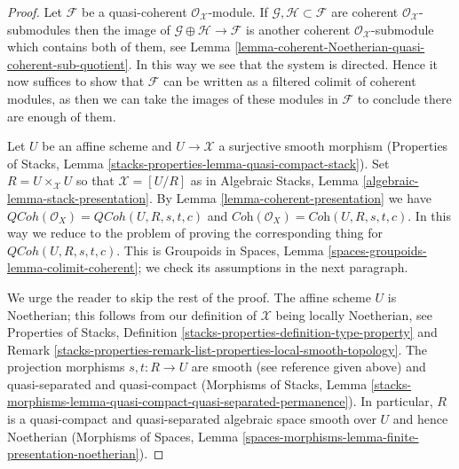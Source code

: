 \documentclass{stacks-project}
\theoremstyle{plain}
\theoremstyle{definition}
\theoremstyle{remark}
\numberwithin{equation}{subsection}
\def\QCoh{\mathit{QCoh}}
\begin{document}
\begin{proof}
Let $\mathcal{F}$ be a quasi-coherent $\mathcal{O}_\mathcal{X}$-module.
If $\mathcal{G}, \mathcal{H} \subset \mathcal{F}$ are coherent
$\mathcal{O}_\mathcal{X}$-submodules then the image of
$\mathcal{G} \oplus \mathcal{H} \to \mathcal{F}$ is another
coherent $\mathcal{O}_\mathcal{X}$-submodule which contains both of them,
see Lemma \ref{lemma-coherent-Noetherian-quasi-coherent-sub-quotient}.
In this way we see that the system is directed.
Hence it now suffices to show that $\mathcal{F}$ can be written as
a filtered colimit of coherent modules, as then we can take the
images of these modules in $\mathcal{F}$ to conclude there are
enough of them.

\medskip\noindent
Let $U$ be an affine scheme and $U \to \mathcal{X}$
a surjective smooth morphism (Properties of Stacks, Lemma
\ref{stacks-properties-lemma-quasi-compact-stack}).
Set $R = U \times_\mathcal{X} U$ so that $\mathcal{X} = [U/R]$
as in Algebraic Stacks, Lemma \ref{algebraic-lemma-stack-presentation}.
By Lemma \ref{lemma-coherent-presentation} we have
$\QCoh(\mathcal{O}_X) = \QCoh(U, R, s, t, c)$ and
$\textit{Coh}(\mathcal{O}_X) = \textit{Coh}(U, R, s, t, c)$.
In this way we reduce to the problem of proving the corresponding thing for
$\QCoh(U, R, s, t, c)$. This is
Groupoids in Spaces, Lemma \ref{spaces-groupoids-lemma-colimit-coherent};
we check its assumptions in the next paragraph.

\medskip\noindent
We urge the reader to skip the rest of the proof.
The affine scheme $U$ is Noetherian; this follows from our definition
of $\mathcal{X}$ being locally Noetherian, see
Properties of Stacks, Definition
\ref{stacks-properties-definition-type-property} and
Remark \ref{stacks-properties-remark-list-properties-local-smooth-topology}.
The projection morphisms $s, t : R \to U$ are smooth (see reference
given above)
and quasi-separated and quasi-compact (Morphisms of Stacks, Lemma
\ref{stacks-morphisms-lemma-quasi-compact-quasi-separated-permanence}).
In particular, $R$ is a quasi-compact and quasi-separated algebraic space
smooth over $U$ and hence Noetherian
(Morphisms of Spaces, Lemma
\ref{spaces-morphisms-lemma-finite-presentation-noetherian}).
\end{proof}











\end{document}
